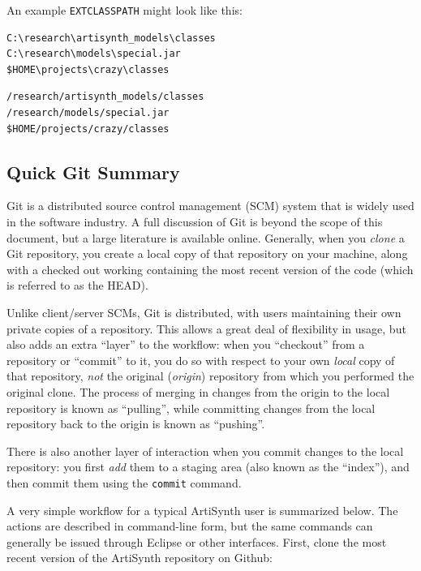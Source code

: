 An example {\tt EXTCLASSPATH} might look like this:

\ifWindows
\begin{verbatim}
C:\research\artisynth_models\classes
C:\research\models\special.jar
$HOME\projects\crazy\classes
\end{verbatim}
\else %
\begin{verbatim}
/research/artisynth_models/classes
/research/models/special.jar
$HOME/projects/crazy/classes
\end{verbatim}
\fi %

\subsection{Quick Git Summary}
\label{GitSummary}

Git is a distributed source control management (SCM) system that is
widely used in the software industry.  A full discussion of Git is
beyond the scope of this document, but a large literature is available
online. Generally, when you {\it clone} a Git repository, you create a
local copy of that repository on your machine, along with a checked
out working \directory{} containing the most recent version of the code
(which is referred to as the HEAD).

Unlike client/server SCMs, Git is distributed, with users maintaining
their own private copies of a repository. This allows a great deal of
flexibility in usage, but also adds an extra ``layer'' to the
workflow: when you ``checkout'' from a repository or ``commit'' to it,
you do so with respect to your own {\it local} copy of that
repository, {\it not} the original ({\it origin}) repository from
which you performed the original clone. The process of merging in
changes from the origin to the local repository is known as
``pulling'', while committing changes from the local repository back
to the origin is known as ``pushing''.

There is also another layer of interaction when you commit changes to
the local repository: you first {\it add} them to a staging area
(also known as the ``index''), and then commit them using the {\tt commit}
command.

A very simple workflow for a typical ArtiSynth user is summarized
below. The actions are described in command-line form, but the same
commands can generally be issued through Eclipse or other
interfaces. First, clone the most recent version of the ArtiSynth
repository on Github:


